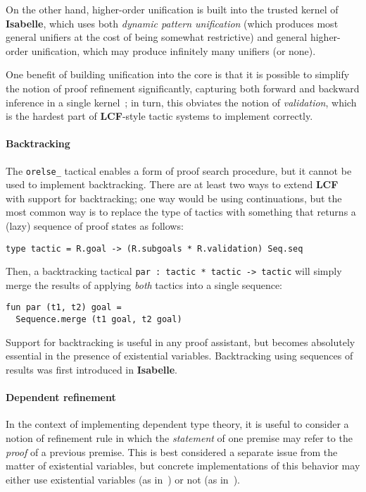 \documentclass{article}
\newcommand\FormatLang[1]{{\bfseries\sffamily #1}}
\newcommand\LCF{\FormatLang{LCF}}
\newcommand\Isabelle{\FormatLang{Isabelle}}
\theoremstyle{definition}
\theoremstyle{remark}
\begin{document}
On the other hand, higher-order unification is built into the trusted
kernel of \Isabelle{}, which uses both \emph{dynamic pattern
  unification} (which produces most general unifiers at the cost of
being somewhat restrictive) and general higher-order unification,
which may produce infinitely many unifiers (or none).

One benefit of building unification into the core is that it is
possible to simplify the notion of proof refinement significantly,
capturing both forward and backward inference in a single
kernel~\cite{paulson:1998}; in turn, this obviates the notion of
\emph{validation}, which is the hardest part of \LCF{}-style tactic
systems to implement correctly.


\paragraph{Backtracking}
The \verb|orelse_| tactical enables a form of proof search procedure,
but it cannot be used to implement backtracking. There are at least
two ways to extend \LCF{} with support for backtracking; one way would
be using continuations, but the most common way is to replace the type
of tactics with something that returns a (lazy) sequence of proof
states as follows:
\begin{verbatim}
type tactic = R.goal -> (R.subgoals * R.validation) Seq.seq
\end{verbatim}

Then, a backtracking tactical \verb|par : tactic * tactic -> tactic|
will simply merge the results of applying \emph{both} tactics into a
single sequence:
\begin{verbatim}
fun par (t1, t2) goal =
  Sequence.merge (t1 goal, t2 goal)
\end{verbatim}

Support for backtracking is useful in any proof assistant, but becomes
absolutely essential in the presence of existential
variables. Backtracking using sequences of results was first introduced
in \Isabelle.


\paragraph{Dependent refinement}
In the context of implementing dependent type theory, it is useful to
consider a notion of refinement rule in which the \emph{statement} of
one premise may refer to the \emph{proof} of a previous premise. This
is best considered a separate issue from the matter of existential
variables, but concrete implementations of this behavior may either
use existential variables (as in~\cite{spiwack:2011,asperti:2011}) or not (as
in~\cite{sterling-harper:2017,redprl:2016}).

\nocite{pollack:1995}


\end{document}
